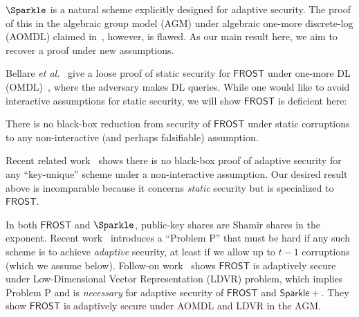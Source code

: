  

$\Sparkle$ is a natural scheme explicitly designed for adaptive security. 
The proof of this in the algebraic group model (AGM) under algebraic one-more discrete-log (AOMDL) 
claimed in~\cite{C:CriKomMal23}, however, is flawed. As our main result here, 
we aim to recover a  proof under new assumptions.

  Bellare \emph{et al.}~\cite{C:BCKMTZ22}  give a loose  proof of static security for $\mathsf{FROST}$ under one-more DL (OMDL)~\cite{JC:BNPS03}, where the adversary makes DL queries. While one would like to avoid interactive assumptions for static security,  we  will show $\mathsf{FROST}$ is deficient here:
\begin{conj}
    There is no black-box reduction from  security of  $\mathsf{FROST}$ under static corruptions to any non-interactive (and perhaps falsifiable) assumption.
\end{conj}
Recent related work~\cite{EPRINT:CriKomMal25} shows there is no black-box proof of adaptive security for any ``key-unique'' scheme under a non-interactive assumption.
 Our desired result above is incomparable  because it  concerns  \emph{static} security but is specialized to  $\mathsf{FROST}$. 
 
In both $\mathsf{FROST}$ and $\Sparkle$, public-key shares are Shamir shares in the exponent. Recent work~\cite{C:CriSte25} introduces a ``Problem P'' that must be hard if any such scheme is to achieve \emph{adaptive} security, at least if we allow up to $t-1$ corruptions (which we assume below). Follow-on work~\cite{C:KKTZ25} shows  $\mathsf{FROST}$ is adaptively secure under  Low-Dimensional Vector Representation (LDVR) problem, which implies Problem P and is \emph{necessary} for adaptive security of $\mathsf{FROST}$ and $\mathsf{Sparkle+}$. They show   $\mathsf{FROST}$ is adaptively secure under AOMDL and LDVR in the AGM. %

